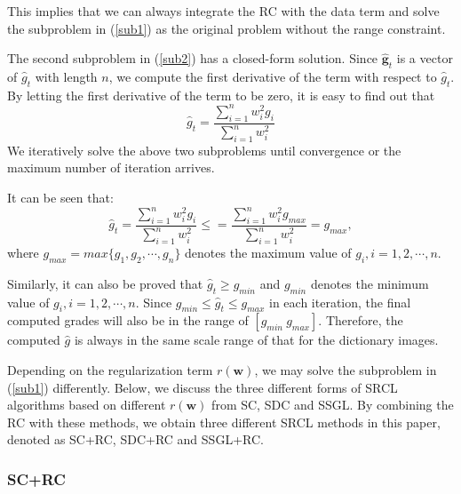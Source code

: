 \documentclass[journal]{IEEEtran}
\begin{document}
   This implies that we can always integrate the RC with the data term and  solve the subproblem in (\ref{sub1}) as the original problem without the range constraint.  
 
  The second subproblem in (\ref{sub2}) has a closed-form solution. Since $\hat{\textbf{g}}_t$ is a vector of $\hat{g}_t$ with length $n$, we compute the first derivative of the term with respect to   $\hat{g}_{t}$.  
  By letting the first derivative of the term to be zero, it is easy to find out  that 
  \begin{equation}
   \hat{g}_{t}=\frac{\sum_{i=1}^n w_i^2g_i}{\sum_{i=1}^n w_i^2}
  \end{equation}
  We iteratively solve the above two subproblems until convergence or the maximum number of iteration arrives. 
  
  It can be seen that:
  \begin{equation}
   \hat{g}_{t}=\frac{\sum_{i=1}^n w_i^2g_i}{\sum_{i=1}^n w_i^2}\leq=\frac{\sum_{i=1}^n w_i^2g_{max}}{\sum_{i=1}^n w_i^2}=g_{max},
  \end{equation}
  where $g_{max}=max\{g_1, g_2, \cdots, g_n \}$ denotes the maximum value of $g_i, i=1, 2, \cdots, n$.
  
  Similarly, it can also be proved that $\hat{g}_t \geq g_{min}$ and $g_{min}$ denotes the minimum value of $g_i, i=1, 2, \cdots, n$. Since $g_{min}\leq \hat{g}_t \leq g_{max}$ in each iteration, the final computed grades will also 
  be in the range of $[g_{min}~g_{max}]$. Therefore, the computed $\hat{g}$ is always in the same scale range of that for the dictionary images.
  
  Depending on the regularization term $r(\textbf{w})$, we may solve the subproblem in (\ref{sub1}) differently.
  Below, we discuss the three different forms of SRCL algorithms based on different $r(\textbf{w})$ from SC, SDC and SSGL. By combining the RC with these  methods, we obtain three different SRCL methods in this paper, denoted as SC+RC, SDC+RC and SSGL+RC.
  
  
 \subsubsection{SC+RC}  
 
\end{document}
